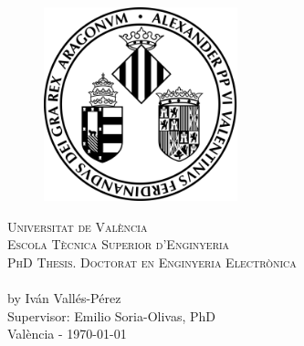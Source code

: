 
\makeatletter
\begin{titlepage}

	\begin{figure}[t]
		\centering\includegraphics[width=0.5\textwidth]{titlepage/images/logo}
	\end{figure}
	
	\begin{center}
	\textsc{ \LARGE{Universitat de València \\}}
	\textsc{ \LARGE{Escola Tècnica Superior d'Enginyeria \\ }}
	\vspace{5mm}
	{\textsc{PhD Thesis. Doctorat en Enginyeria Electrònica}\\}
	\vspace{40mm}
	\LARGE{\textbf{\@title}\\}
	\vspace{5mm}
	{\large by Iván Vallés-Pérez \\}
	\vspace{40mm}
	\large{Supervisor: Emilio Soria-Olivas, PhD \\ }
	\large{València - \monthyeardate\today }
	\end{center}

\end{titlepage}
\makeatother